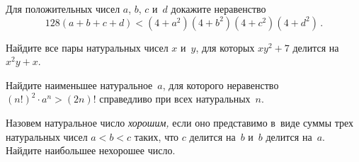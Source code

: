 \begin{problems}

\item
Для положительных чисел $a$, $b$, $c$ и~$d$ докажите неравенство
\[
    128 (a + b + c + d)
<
    (4 + a^2) (4 + b^2) (4 + c^2) (4 + d^2)
\, . \]


\item
Найдите все пары натуральных чисел $x$ и~$y$, для которых $x y^2 + 7$ делится
на~$x^2 y + x$.


\item
Найдите наименьшее натуральное~$a$, для которого неравенство
$(n!)^2 \cdot a^n > (2 n)!$ справедливо при всех натуральных~$n$.


\item
Назовем натуральное число \emph{хорошим,} если оно представимо в~виде суммы
трех натуральных чисел $a < b < c$ таких, что $c$ делится на~$b$ и~$b$
делится на~$a$.
Найдите наибольшее нехорошее число.


\end{problems}
